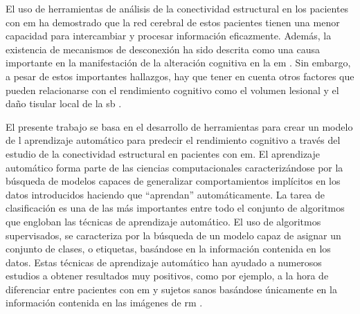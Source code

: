 El uso de herramientas de análisis de la conectividad estructural en los pacientes con \gls{em} ha demostrado que la red cerebral de estos pacientes tienen una menor capacidad para intercambiar y procesar información eficazmente. Además, la existencia de mecanismos de desconexión ha sido descrita como una causa importante en la manifestación de la alteración cognitiva en la \gls{em} \cite{Shu2011DiffusionSclerosis} \cite{Llufriu2017StructuralSclerosis} \cite{Bozzali2013AnatomicalSclerosis} \cite{Louapre2014BrainStudy} \cite{Dineen2009DisconnectionSclerosis}. Sin embargo, a pesar de estos importantes hallazgos, hay que tener en cuenta otros factores que pueden relacionarse con el rendimiento cognitivo como el volumen lesional y el daño tisular local de la \gls{sb} \cite{Stellmann2017ReducedMS} \cite{Ouellette2018LesionSclerosis.}. 

El presente trabajo se basa en el desarrollo de herramientas para crear un modelo de l aprendizaje automático para predecir el rendimiento cognitivo a través del estudio de la conectividad estructural en  pacientes con \gls{em}. El aprendizaje automático forma parte de las ciencias computacionales caracterizándose por la búsqueda de modelos capaces de generalizar comportamientos implícitos en los datos introducidos haciendo que ``aprendan'' automáticamente. La tarea de clasificación es una de las más importantes entre todo el conjunto de algoritmos que engloban las técnicas de aprendizaje automático. El uso de algoritmos supervisados, se caracteriza por la búsqueda de un modelo capaz de asignar un conjunto de clases, o etiquetas, basándose en la información contenida en los datos. Estas técnicas de aprendizaje automático han ayudado a numerosos estudios a obtener resultados muy positivos, como por ejemplo, a la hora de diferenciar entre pacientes con \gls{em} y sujetos sanos basándose únicamente en la información contenida en las imágenes de \gls{rm} \cite{Zhang2016ComparisonMachine}.